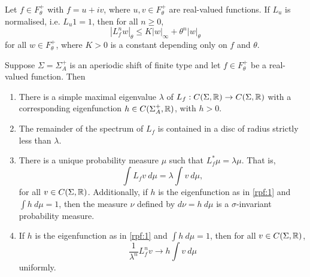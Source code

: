 \begin{proposition}
	Let $f \in F_\theta^+$ with $f = u + iv$, where $u, v \in F_\theta^+$ are real-valued functions. If $L_u$ is normalised, i.e. $L_u{1} = 1$, then for all $n \geq 0$,
	\[
		|L_f^n{w}|_\theta \leq K|w|_\infty + \theta^n |w|_\theta
	\]
	for all $w \in F_\theta^+$, where $K > 0$ is a constant depending only on $f$ and $\theta$.
\end{proposition}

\begin{theorem} \label{thm:rpf}
	Suppose $\Sigma = \Sigma_A^+$ is an aperiodic shift of finite type and let $f \in F_\theta^+$ be a real-valued function. Then
	\begin{enumerate}
		\item There is a simple maximal eigenvalue $\lambda$ of $L_f : C(\Sigma, \mathbb{R}) \to C(\Sigma, \mathbb{R})$ with a corresponding eigenfunction $h \in C(\Sigma_A^+, \mathbb{R})$, with $h > 0$. \label{rpf:1}
		\item The remainder of the spectrum of $L_f$ is contained in a disc of radius strictly less than $\lambda$. \label{rpf:2}
		\item There is a unique probability measure $\mu$ such that $L_f^*{\mu} = \lambda\mu$. That is,
		\[
			\int{L_f{v}\ d\mu} = \lambda \int{v\ d\mu},
		\]
		for all $v \in C(\Sigma, \mathbb{R})$. Additionally, if $h$ is the eigenfunction as in \ref{rpf:1} and $\int{h\ d\mu} = 1$, then the measure $\nu$ defined by $d\nu = h\ d\mu$ is a $\sigma$-invariant probability measure. \label{rpf:3}
		\item If $h$ is the eigenfunction as in \ref{rpf:1} and $\int{h\ d\mu} = 1$, then for all $v \in C(\Sigma, \mathbb{R})$,
		\[
			\frac{1}{\lambda^n}L_f^n{v} \to h \int{v\ d\mu}
		\]
		uniformly. \label{rpf:4}
	\end{enumerate}
\end{theorem}
